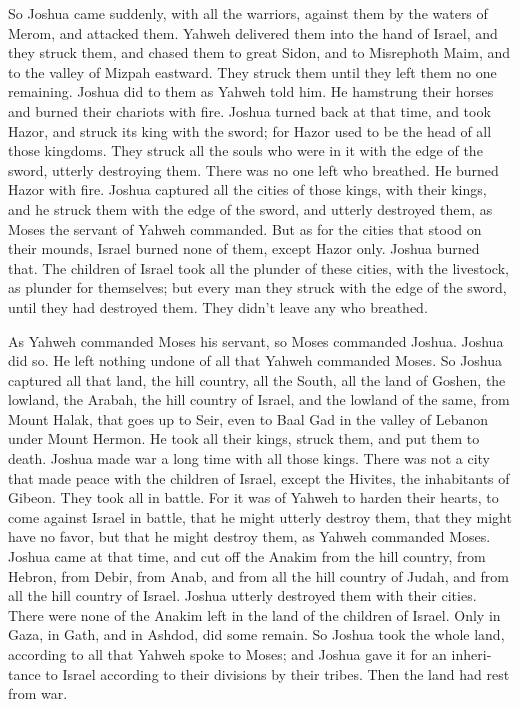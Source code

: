 \begin{paracol}{2}
\begin{otherlanguage}{english}
 So Joshua came suddenly, with all the warriors, against
them by the waters of Merom, and attacked them.  Yahweh
delivered them into the hand of Israel, and they struck them, and chased
them to great Sidon, and to Misrephoth Maim, and to the valley of Mizpah
eastward. They struck them until they left them no one remaining.
 Joshua did to them as Yahweh told him. He hamstrung their
horses and burned their chariots with fire.  Joshua
turned back at that time, and took Hazor, and struck its king with the
sword; for Hazor used to be the head of all those kingdoms.
 They struck all the souls who were in it with the edge
of the sword, utterly destroying them. There was no one left who
breathed. He burned Hazor with fire.  Joshua captured all
the cities of those kings, with their kings, and he struck them with the
edge of the sword, and utterly destroyed them, as Moses the servant of
Yahweh commanded.  But as for the cities that stood on
their mounds, Israel burned none of them, except Hazor only. Joshua
burned that.  The children of Israel took all the plunder
of these cities, with the livestock, as plunder for themselves; but
every man they struck with the edge of the sword, until they had
destroyed them. They didn't leave any who breathed.

 As Yahweh commanded Moses his servant, so Moses
commanded Joshua. Joshua did so. He left nothing undone of all that
Yahweh commanded Moses.  So Joshua captured all that
land, the hill country, all the South, all the land of Goshen, the
lowland, the Arabah, the hill country of Israel, and the lowland of the
same,  from Mount Halak, that goes up to Seir, even to
Baal Gad in the valley of Lebanon under Mount Hermon. He took all their
kings, struck them, and put them to death.  Joshua made
war a long time with all those kings.  There was not a
city that made peace with the children of Israel, except the Hivites,
the inhabitants of Gibeon. They took all in battle.  For
it was of Yahweh to harden their hearts, to come against Israel in
battle, that he might utterly destroy them, that they might have no
favor, but that he might destroy them, as Yahweh commanded Moses.
 Joshua came at that time, and cut off the Anakim from
the hill country, from Hebron, from Debir, from Anab, and from all the
hill country of Judah, and from all the hill country of Israel. Joshua
utterly destroyed them with their cities.  There were
none of the Anakim left in the land of the children of Israel. Only in
Gaza, in Gath, and in Ashdod, did some remain.  So Joshua
took the whole land, according to all that Yahweh spoke to Moses; and
Joshua gave it for an inheritance to Israel according to their divisions
by their tribes. Then the land had rest from war.


\end{otherlanguage}
\end{paracol}
